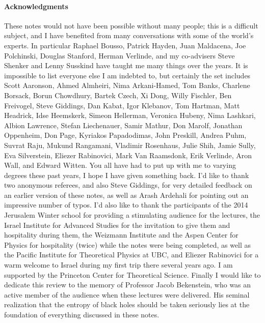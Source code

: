 \documentclass[12pt]{article}
\begin{document}
\paragraph{Acknowledgments}  These notes would not have been possible without many people; this is a difficult subject, and I have benefited from many conversations with some of the world's experts.  In particular Raphael Bousso, Patrick Hayden, Juan Maldacena, Joe Polchinski, Douglas Stanford, Herman Verlinde, and my co-advisers Steve Shenker and Lenny Susskind have taught me many things over the years.  It is impossible to list everyone else I am indebted to, but certainly the set includes Scott Aaronson, Ahmed Almheiri, Nima Arkani-Hamed, Tom Banks, Charlene Borsack, Borun Chowdhury, Bartek Czech, Xi Dong, Willy Fischler, Ben Freivogel, Steve Giddings, Dan Kabat, Igor Klebanov, Tom Hartman, Matt Headrick, Idse Heemskerk, Simeon Hellerman, Veronica Hubeny, Nima Lashkari, Albion Lawrence, Stefan Liechenauer, Samir Mathur, Don Marolf, Jonathan Oppenheim, Don Page, Kyriakos Papadodimas, John Preskill, Andrea Puhm, Suvrat Raju, Mukund Rangamani, Vladimir Rosenhaus, Julie Shih, Jamie Sully, Eva Silverstein, Eliezer Rabinovici, Mark Van Raamsdonk, Erik Verlinde, Aron Wall, and Edward Witten.  You all have had to put up with me to varying degrees these past years, I hope I have given something back.  I'd like to thank two anonymous referees, and also Steve Giddings, for very detailed feedback on an earlier version of these notes, as well as Arash Ardehali for pointing out an impressive number of typos.  I'd also like to thank the participants of the 2014 Jerusalem Winter school for providing a stimulating audience for the lectures, the Israel Institute for Advanced Studies for the invitation to give them and hospitality during them, the Weizmann Institute and the Aspen Center for Physics for hospitality (twice) while the notes were being completed, as well as the Pacific Institute for Theoretical Physics at UBC, and Eliezer Rabinovici for a warm welcome to Israel during my first trip there several years ago. I am supported by the Princeton Center for Theoretical Science.  Finally I would like to dedicate this review to the memory of Professor Jacob Bekenstein, who was an active member of the audience when these lectures were delivered.  His seminal realization that the entropy of black holes should be taken seriously lies at the foundation of everything discussed in these notes.



\appendix
\end{document}
